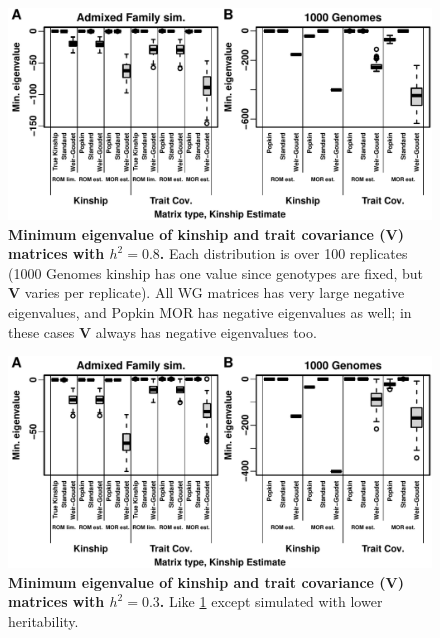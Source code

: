 \documentclass[11pt]{article}
\begin{document}
\begin{figure}[bp!]
  \centering
  \includegraphics[width=\textwidth]{emin.pdf}
  \caption{
    {\bf Minimum eigenvalue of kinship and trait covariance ($\mathbf{V}$) matrices with $h^2=0.8$.}
    Each distribution is over 100 replicates (1000 Genomes kinship has one value since genotypes are fixed, but $\mathbf{V}$ varies per replicate).
    All WG matrices has very large negative eigenvalues, and Popkin MOR has negative eigenvalues as well; in these cases $\mathbf{V}$ always has negative eigenvalues too.
  }
  \label{fig:emin}
\end{figure}

\begin{figure}[bp!]
  \centering
  \includegraphics[width=\textwidth]{h-0.3/emin.pdf}
  \caption{
    {\bf Minimum eigenvalue of kinship and trait covariance ($\mathbf{V}$) matrices with $h^2=0.3$.}
    Like \cref{fig:emin} except simulated with lower heritability.
  }
  \label{fig:emin-h3}
\end{figure}
\end{document}
